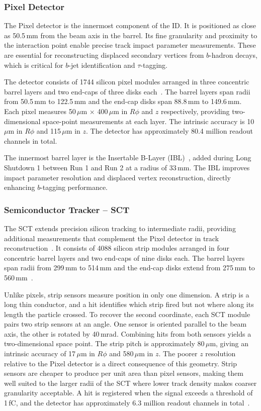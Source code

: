 \subsubsection{Pixel Detector}

The Pixel detector is the innermost component of the ID. 
It is positioned as close as 50.5\,mm from the beam axis in the barrel. 
Its fine granularity and proximity to the interaction point enable precise track impact parameter measurements. 
These are essential for reconstructing displaced secondary vertices from $b$-hadron decays, which is critical for $b$-jet identification and $\tau$-tagging.

The detector consists of 1744 silicon pixel modules arranged in three concentric barrel layers and two end-caps of three disks each~\cite{atlas}. 
The barrel layers span radii from 50.5\,mm to 122.5\,mm and the end-cap disks span 88.8\,mm to 149.6\,mm. 
Each pixel measures 50\,$\mu$m $\times$ 400\,$\mu$m in $R\phi$ and $z$ respectively, providing two-dimensional space-point measurements at each layer. 
The intrinsic accuracy is 10\,$\mu$m in $R\phi$ and 115\,$\mu$m in $z$. 
The detector has approximately 80.4 million readout channels in total.

The innermost barrel layer is the Insertable B-Layer (IBL)~\cite{Abbott:2018ikt}, added during Long Shutdown 1 between Run 1 and Run 2 at a radius of 33\,mm. 
The IBL improves impact parameter resolution and displaced vertex reconstruction, directly enhancing $b$-tagging performance.

\subsubsection{Semiconductor Tracker -- SCT}

The SCT extends precision silicon tracking to intermediate radii, providing additional measurements that complement the Pixel detector in track reconstruction~\cite{atlas}.
It consists of 4088 silicon strip modules arranged in four concentric barrel layers and two end-caps of nine disks each. 
The barrel layers span radii from 299\,mm to 514\,mm and the end-cap disks extend from 275\,mm to 560\,mm~\cite{atlas}.

Unlike pixels, strip sensors measure position in only one dimension. 
A strip is a long thin conductor, and a hit identifies which strip fired but not where along its length the particle crossed. 
To recover the second coordinate, each SCT module pairs two strip sensors at an angle.
One sensor is oriented parallel to the beam axis, the other is rotated by 40\,mrad. 
Combining hits from both sensors yields a two-dimensional space point. 
The strip pitch is approximately 80\,$\mu$m, giving an intrinsic accuracy of 17\,$\mu$m in $R\phi$ and 580\,$\mu$m in $z$. 
The poorer $z$ resolution relative to the Pixel detector is a direct consequence of this geometry. 
Strip sensors are cheaper to produce per unit area than pixel sensors, making them well suited to the larger radii of the SCT where lower track density makes coarser granularity acceptable. 
A hit is registered when the signal exceeds a threshold of 1\,fC, and the detector has approximately 6.3 million readout channels in total~\cite{atlas}.

